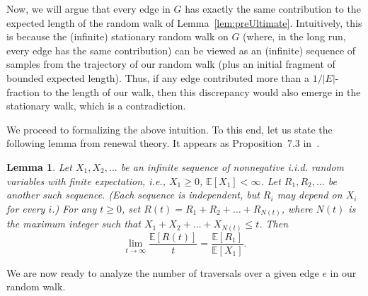 \documentclass[11pt, letterpaper]{article}
\newtheorem{lemma}[theorem]{Lemma}
\newcommand{\bE}{\mathbb{E}}
\begin{document}
Now, we will argue that every edge in $G$ has exactly the same contribution to the expected length of the random walk of Lemma~\ref{lem:preUltimate}. Intuitively, this is because the (infinite) stationary random walk on $G$ (where, in the long run, every edge has the same contribution) can be viewed as an (infinite) sequence of samples from the trajectory of our random walk (plus an initial fragment of bounded expected length). Thus, if any edge contributed more than a $1/|E|$-fraction to the length of our walk, then this discrepancy would also emerge in the stationary walk, which is a contradiction.

We proceed to formalizing the above intuition. To this end, let us state the following lemma from renewal theory. It appears as Proposition~7.3 in~\cite{Ross09}.
\begin{lemma} \label{lem:renewal_theory}
Let $X_1, X_2, \ldots$ be an infinite sequence of nonnegative i.i.d. random variables with finite expectation, i.e., $X_1 \ge 0$, $\bE[X_1] < \infty$. Let $R_1, R_2, \ldots$ be another such sequence. (Each sequence is independent, but $R_i$ may depend on $X_i$ for every $i$.) For any $t \ge 0$, set $R(t) = R_1 + R_2 + \dots + R_{N(t)}$, where $N(t)$ is the maximum integer such that $X_1 + X_2 + \dots + X_{N(t)} \le t$. Then
\[ \lim_{t \to \infty} \frac{\bE[R(t)]}{t} = \frac{\bE[R_1]}{\bE[X_1]}. \]
\end{lemma}

We are now ready to analyze the number of traversals over a given edge $e$ in our random walk. 
\end{document}
